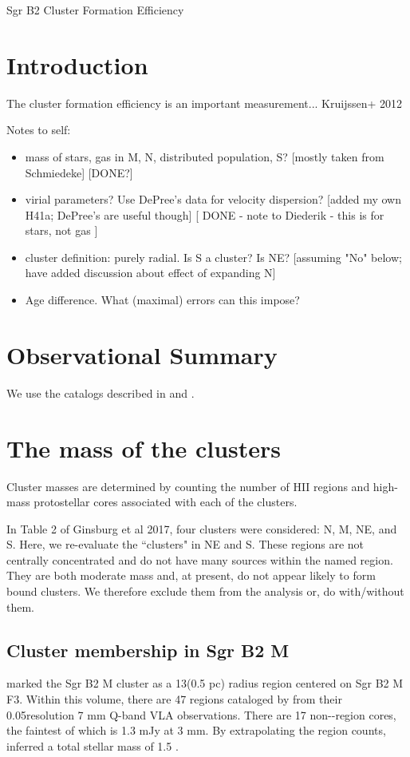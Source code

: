 \documentclass[twocolumn]{aastex61}
\begin{document}
Sgr B2 Cluster Formation Efficiency

\section{Introduction}

The cluster formation efficiency is an important measurement...
Kruijssen+ 2012

Notes to self:
\begin{itemize}
    \item mass of stars, gas in M, N, distributed population, S? [mostly taken from Schmiedeke] [DONE?]
    \item virial parameters?  Use DePree's data for velocity dispersion?  [added my own H41a; DePree's are useful though] [ DONE - note to Diederik - this is for stars, not gas ]
    \item cluster definition: purely radial.  Is S a cluster?  Is NE?  [assuming "No" below; have added discussion about effect of expanding N]
    \item Age difference.  What (maximal) errors can this impose?
\end{itemize}

\section{Observational Summary}

We use the catalogs described in \citet{Ginsburg2017c} and \citet{De-Pree2015a}.


\section{The mass of the clusters}
Cluster masses are determined by counting the number of HII regions and high-mass
protostellar cores associated with each of the clusters.

In Table 2 of Ginsburg et al 2017, four clusters were considered: N, M, NE, and
S.  Here, we re-evaluate the ``clusters" in NE and S.  These regions are not
centrally concentrated and do not have many sources within the named region.
They are both moderate mass and, at present, do not appear likely to form bound
clusters.  We therefore exclude them from the analysis {\color{red} or, do with/without
them}.



\subsection{Cluster membership in Sgr B2 M}
\citet{Schmiedeke2016a} marked the Sgr B2 M cluster as a 13\arcsec  (0.5 pc) radius
region centered on Sgr B2 M F3.  Within this volume, there are 47 \hii regions
cataloged by \citet{De-Pree201?} from their 0.05\arcsec resolution 7 mm Q-band
VLA observations.  There are 17 non-\hii-region cores, the faintest of which is
1.3 mJy at 3 mm.  By extrapolating the \hii region counts,
\citet{Ginsburg2017c} inferred a total stellar mass of 1.5 \msun.
\end{document}
